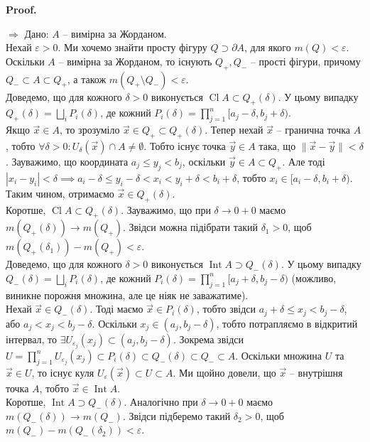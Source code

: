 \documentclass[a4paper, 10pt]{article}
\makeatletter
\def\qed{$\blacksquare$}
\def\rightproof{$\boxed{\Rightarrow}$ }
\theoremstyle{theoremdd}
\theoremstyle{theoremdd}
\theoremstyle{theoremdd}
\theoremstyle{theoremdd}
\theoremstyle{theoremdd}
\theoremstyle{theoremdd}
\theoremstyle{theoremdd}
\theoremstyle{theoremdd}
\theoremstyle{theoremdd}
\theoremstyle{theoremdd}
\theoremstyle{theoremdd}
\theoremstyle{theoremdd}
\theoremstyle{theoremdd}
\theoremstyle{theoremdd}
\theoremstyle{theoremdd}
\renewenvironment{proof}[1][Proof.\\]{\par
\pushQED{\hfill \qed}%
\normalfont \topsep6\p@\@plus6\p@\relax
\trivlist
\item\relax
{\bfseries
#1\@addpunct{.}}\hspace\labelsep\ignorespaces
}{%
\popQED\endtrivlist\@endpefalse
}
\DeclareMathOperator{\Int}{Int}
\DeclareMathOperator{\Cl}{Cl}
\makeatother
\begin{document}
\begin{proof}
\rightproof Дано: $A$ -- вимірна за Жорданом.\\
Нехай $\varepsilon > 0$. Ми хочемо знайти просту фігуру $Q \supset \partial A$, для якого $m(Q) < \varepsilon$.\\
Оскільки $A$ -- вимірна за Жорданом, то існують $Q_+,Q_-$ -- прості фігури, причому $Q_- \subset A \subset Q_+$, а також $m(Q_+ \setminus Q_-) < \varepsilon$.\\
Доведемо, що для кожного $\delta > 0$ виконується $\Cl A \subset Q_+(\delta)$. У цьому випадку $Q_+(\delta) = \displaystyle\bigsqcup_i P_i(\delta)$, де кожний $P_i(\delta) = \displaystyle\prod_{j=1}^n [a_j-\delta, b_j+\delta)$. \\
Якщо $\vec{x} \in A$, то зрозуміло $\vec{x} \in Q_+ \subset Q_+(\delta)$. Тепер нехай $\vec{x}$ -- гранична точка $A$, тобто $\forall \delta > 0: U_\delta(\vec{x}) \cap A \neq \emptyset$. Тобто існує точка $\vec{y} \in A$ така, що $\|\vec{x} - \vec{y}\| < \delta$. Зауважимо, що координата $a_j \leq y_j < b_j$, оскільки $\vec{y} \in A \subset Q_+$. Але тоді $|x_i - y_i| < \delta \implies a_i-\delta \leq y_i - \delta < x_i < y_i + \delta < b_i + \delta$, тобто $x_i \in [a_i-\delta,b_i+\delta)$. Таким чином, отримаємо $\vec{x} \in Q_+(\delta)$.\\
Коротше, $\Cl A \subset Q_+(\delta)$. Зауважимо, що при $\delta \to 0+0$ маємо $m(Q_+(\delta)) \to m(Q_+)$. Звідси можна підібрати такий $\delta_1 > 0$, щоб $m(Q_+(\delta_1)) - m(Q_+) < \varepsilon$.
\bigskip \\
Доведемо, що для кожного $\delta > 0$ виконується $\Int A \supset Q_-(\delta)$. У цьому випадку $Q_-(\delta) = \displaystyle\bigsqcup_i P_i(\delta)$, де кожний $P_i(\delta) = \displaystyle\prod_{j=1}^n [a_j+\delta,b_j-\delta)$ (можливо, виникне порожня множина, але це ніяк не заважатиме).\\
Нехай $\vec{x} \in Q_-(\delta)$. Тоді маємо $\vec{x} \in P_i(\delta)$, тобто звідси $a_j + \delta \leq x_j < b_j - \delta$, або $a_j < x_j < b_j - \delta$. Оскільки $x_j \in (a_j,b_j-\delta)$, тобто потрапляємо в відкритий інтервал, то $\exists U_{\varepsilon_j}(x_j) \subset (a_j,b_j-\delta)$. Зокрема звідси $U = \displaystyle\prod_{j=1}^n U_{\varepsilon_j}(x_j) \subset P_i(\delta) \subset Q_-(\delta) \subset Q_- \subset A$. Оскільки множина $U$ та $\vec{x} \in U$, то існує куля $U_{\varepsilon}(\vec{x}) \subset U \subset A$. Ми щойно довели, що $\vec{x}$ -- внутрішня точка $A$, тобто $\vec{x} \in \Int A$.\\
Коротше, $\Int A \supset Q_-(\delta)$. Аналогічно при $\delta \to 0+0$ маємо $m(Q_-(\delta)) \to m(Q_-)$. Звідси підберемо такий $\delta_2 > 0$, щоб $m(Q_-) - m(Q_-(\delta_2)) < \varepsilon$.\\

\end{proof}
\end{document}
